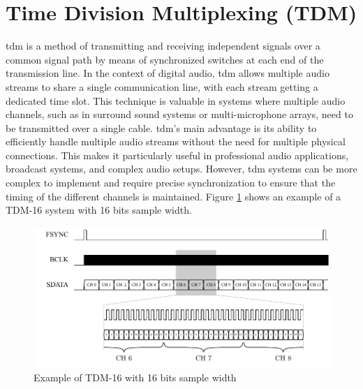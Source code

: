 \section{Time Division Multiplexing (TDM)}
\acrfull{tdm} is a method of transmitting and receiving independent signals over a common signal path by means of synchronized switches at each end of the transmission line.
In the context of digital audio, \acrshort{tdm} allows multiple audio streams to share a single communication line,
with each stream getting a dedicated time slot. This technique is valuable in systems where multiple audio channels,
such as in surround sound systems or multi-microphone arrays, need to be transmitted over a single cable.
\acrshort{tdm}'s main advantage is its ability to efficiently handle multiple audio streams without the need for multiple physical connections.
This makes it particularly useful in professional audio applications, broadcast systems, and complex audio setups.
However, \acrshort{tdm} systems can be more complex to implement and require precise synchronization to ensure that the timing of the different channels is maintained.
Figure \ref{fig:tdm_example} shows an example of a TDM-16 system with 16 bits sample width.
\begin{figure}[h]
	\centering
	\includegraphics[width=1.0\textwidth, trim={0.5cm 0 0 0}]{images/2_preliminaries/tdm_signals.pdf}
	\caption{Example of TDM-16 with 16 bits sample width}
	\label{fig:tdm_example}
\end{figure}

